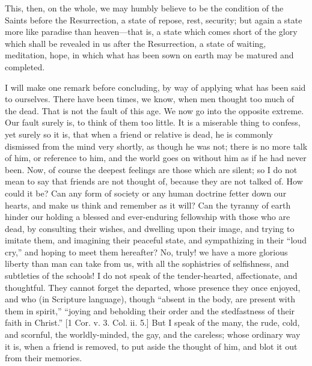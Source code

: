 This, then, on the whole, we may humbly believe to be the condition
of the Saints before the Resurrection, a state of repose, rest,
security; but again a state more like paradise than heaven—that is,
a state which comes short of the glory which shall be revealed in us
after the Resurrection, a state of waiting, meditation, hope, in which
what has been sown on earth may be matured and completed.

I will make one remark before concluding, by way of applying what
has been said to ourselves. There have been times, we know, when men
thought too much of the dead. That is not the fault of this age. We
now go into the opposite extreme. Our fault surely is, to think of
them too little. It is a miserable thing to confess, yet surely so it
is, that when a friend or relative is dead, he is commonly dismissed
from the mind very shortly, as though he was not; there is no more
talk of him, or reference to him, and the world goes on without him as
if he had never been. Now, of course the deepest feelings are those
which are silent; so I do not mean to say that friends are not thought
of, because they are not talked of. How could it be? Can any form of
society or any human doctrine fetter down our hearts, and make us
think and remember as it will? Can the tyranny of earth hinder our
holding a blessed and ever-enduring fellowship with those who are
dead, by consulting their wishes, and dwelling upon their image, and
trying to imitate them, and imagining their peaceful state, and
sympathizing in their ``loud cry,'' and hoping to meet them
hereafter? No, truly! we have a more glorious liberty than man can
take from us, with all the sophistries of selfishness, and subtleties
of the schools! I do not speak of the tender-hearted, affectionate,
and thoughtful. They cannot forget the departed, whose presence they
once enjoyed, and who (in Scripture language), though ``absent in
the body, are present with them in spirit,'' ``joying and
beholding their order and the stedfastness of their faith in
Christ.'' [1 Cor. v. 3. Col. ii. 5.] But I speak of the many, the
rude, cold, and scornful, the worldly-minded, the gay, and the
careless; whose ordinary way it is, when a friend is removed, to put
aside the thought of him, and blot it out from their memories.

